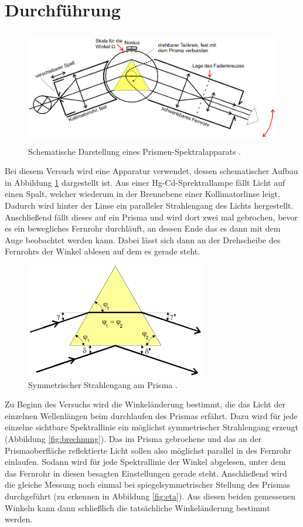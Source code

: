 \section{Durchführung}
\label{sec:Durchführung}

\begin{figure}[H]
  \centering
  \includegraphics[height=5cm]{Aufbau.PNG}
  \caption{Schematische Darstellung eines Prismen-Spektralapparats \cite{sample}.}
  \label{fig:aufbau}
\end{figure}

Bei diesem Versuch wird eine Apparatur verwendet, dessen schematischer Aufbau in Abbildung \ref{fig:aufbau}
dargestellt ist. Aus einer Hg-Cd-Sprektrallampe fällt Licht auf einen Spalt, welcher wiederum in der Brennebene
einer Kollimatorlinse leigt. Dadurch wird hinter der Linse ein paralleler Strahlengang des Lichts hergestellt.
Anschließend fällt dieses auf ein Prisma und wird dort zwei mal gebrochen, bevor es ein bewegliches Fernrohr
durchläuft, an dessen Ende das es dann mit dem Auge beobachtet werden kann. Dabei lässt sich dann
an der Drehscheibe des Fernrohrs der Winkel ablesen auf dem es gerade steht.

\begin{figure}[H]
  \centering
  \includegraphics[height=5cm]{Brechung.PNG}
  \caption{Symmetrischer Strahlengang am Prisma \cite{sample}.}
  \label{fig:brechung}
\end{figure}

Zu Beginn des Versuchs wird die Winkeländerung bestimmt, die das Licht der einzelnen Wellenlängen beim durchlaufen des Prismas
erfährt. Dazu wird für jede einzelne sichtbare Spektrallinie ein möglichst symmetrischer Strahlengang erzeugt (Abbildung \ref{fig:brechnung}).
Das im Prisma gebrochene und das an der Prismaoberfläche reflektierte Licht sollen also möglichst parallel in des Fernrohr einlaufen.
Sodann wird für jede Spektrallinie der Winkel abgelesen, unter dem das Fernrohr in diesen besagten Einstellungen gerade steht.
Anschließend wird die gleiche Messung noch einmal bei spiegelsymmetrischer Stellung des Prismas durchgeführt (zu erkennen in Abbildung \ref{fig:eta}).
Aus diesen beiden gemessenen Winkeln kann dann schließlich die tatsächliche Winkeländerung bestimmt werden.

